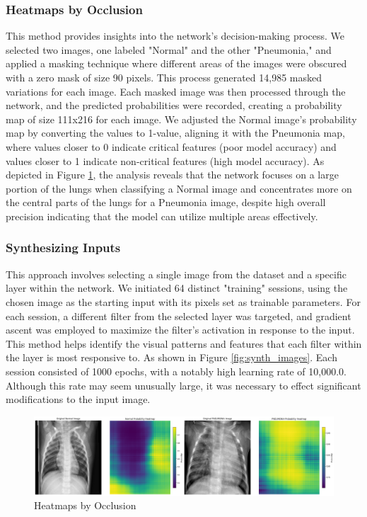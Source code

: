 \documentclass{article}
\begin{document}
\subsubsection{Heatmaps by Occlusion}
This method provides insights into the network's decision-making process. We selected two images, one labeled "Normal" and the other "Pneumonia," and applied a masking technique where different areas of the images were obscured with a zero mask of size 90 pixels. This process generated 14,985 masked variations for each image. Each masked image was then processed through the network, and the predicted probabilities were recorded, creating a probability map of size 111x216 for each image. We adjusted the Normal image's probability map by converting the values to 1-value, aligning it with the Pneumonia map, where values closer to 0 indicate critical features (poor model accuracy) and values closer to 1 indicate non-critical features (high model accuracy). As depicted in Figure \ref{fig:occlusion}, the analysis reveals that the network focuses on a large portion of the lungs when classifying a Normal image and concentrates more on the central parts of the lungs for a Pneumonia image, despite high overall precision indicating that the model can utilize multiple areas effectively.

\subsubsection{Synthesizing Inputs}
This approach involves selecting a single image from the dataset and a specific layer within the network. We initiated 64 distinct "training" sessions, using the chosen image as the starting input with its pixels set as trainable parameters. For each session, a different filter from the selected layer was targeted, and gradient ascent was employed to maximize the filter's activation in response to the input. This method helps identify the visual patterns and features that each filter within the layer is most responsive to. As shown in Figure \ref{fig:synth_images}. Each session consisted of 1000 epochs, with a notably high learning rate of 10,000.0. Although this rate may seem unusually large, it was necessary to effect significant modifications to the input image.


\begin{figure}
  \centering
  \includegraphics[width=0.95\linewidth, angle=0]{occlusion.png}
  \caption{Heatmaps by Occlusion}
  \label{fig:occlusion}
\end{figure}
\end{document}
